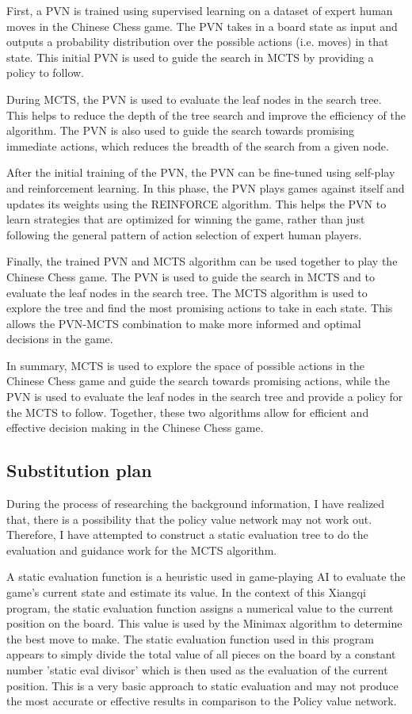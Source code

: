 \documentclass[10pt,twocolumn]{article}
\begin{document}
\begin{itemize}
    First, a PVN is trained using supervised learning on a dataset of expert human moves in the Chinese Chess game. The PVN takes in a board state as input and outputs a probability distribution over the possible actions (i.e. moves) in that state. This initial PVN is used to guide the search in MCTS by providing a policy to follow.

    During MCTS, the PVN is used to evaluate the leaf nodes in the search tree. This helps to reduce the depth of the tree search and improve the efficiency of the algorithm. The PVN is also used to guide the search towards promising immediate actions, which reduces the breadth of the search from a given node.

    After the initial training of the PVN, the PVN can be fine-tuned using self-play and reinforcement learning. In this phase, the PVN plays games against itself and updates its weights using the REINFORCE algorithm. This helps the PVN to learn strategies that are optimized for winning the game, rather than just following the general pattern of action selection of expert human players.

    Finally, the trained PVN and MCTS algorithm can be used together to play the Chinese Chess game. The PVN is used to guide the search in MCTS and to evaluate the leaf nodes in the search tree. The MCTS algorithm is used to explore the tree and find the most promising actions to take in each state. This allows the PVN-MCTS combination to make more informed and optimal decisions in the game.

    In summary, MCTS is used to explore the space of possible actions in the Chinese Chess game and guide the search towards promising actions, while the PVN is used to evaluate the leaf nodes in the search tree and provide a policy for the MCTS to follow. Together, these two algorithms allow for efficient and effective decision making in the Chinese Chess game.

\subsection{Substitution plan}
    During the process of researching the background information, I have realized that, there is a possibility that the policy value network may not work out. Therefore, I have attempted to construct a static evaluation tree to do the evaluation and guidance work for the MCTS algorithm. 

    A static evaluation function is a heuristic used in game-playing AI to evaluate the game's current state and estimate its value. In the context of this Xiangqi program, the static evaluation function assigns a numerical value to the current position on the board. This value is used by the Minimax algorithm to determine the best move to make. The static evaluation function used in this program appears to simply divide the total value of all pieces on the board by a constant number 'static eval divisor' which is then used as the evaluation of the current position. This is a very basic approach to static evaluation and may not produce the most accurate or effective results in comparison to the Policy value network.


\end{itemize}
\end{document}

